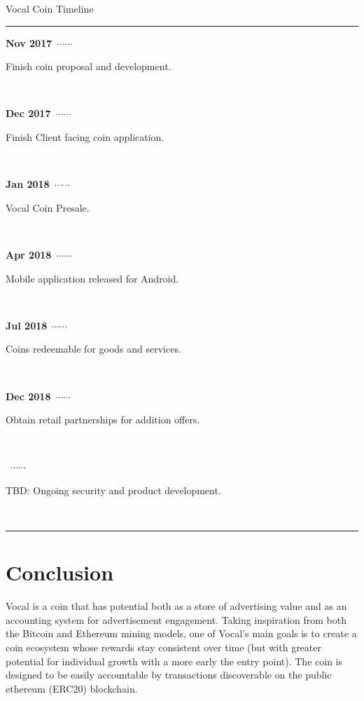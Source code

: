 \documentclass[conference]{IEEEtran}
\begin{document}
    \newcommand\ytl[2]{
    \parbox[b]{8em}{\hfill{\color{cyan}\bfseries\sffamily #1}~$\cdots\cdots$~}\makebox[0pt][c]{$\bullet$}\vrule\quad \parbox[c]{3cm}{\vspace{7pt}\color{red!40!black!80}\raggedright\sffamily #2.\\[7pt]}\\[-3pt]}
    \begin{table}
    \caption{Vocal Coin Timeline}
    \centering
    \begin{minipage}[t]{\linewidth}
    \color{gray}
    \rule{\linewidth}{1pt}
    \ytl{Nov 2017}{Finish coin proposal and development}
    \ytl{Dec 2017}{Finish Client facing coin application}
    \ytl{Jan 2018}{Vocal Coin Presale}
    \ytl{Apr 2018}{Mobile application released for Android}
    \ytl{Jul 2018}{Coins redeemable for goods and services}
    \ytl{Dec 2018}{Obtain retail partnerships for addition offers}
    \ytl{2019}{TBD: Ongoing security and product development}
    \bigskip
    \rule{\linewidth}{1pt}%
    \end{minipage}%
    \end{table}

      
      
    
    \section{Conclusion}
   Vocal is a coin that has potential both as a store of advertising value and as an accounting system for advertisement engagement. Taking inspiration from both the Bitcoin and Ethereum mining models, one of Vocal's main goals is to create a coin ecosystem whose rewards stay consistent over time (but with greater potential for individual growth with a more early the entry point). The coin is designed to be easily accountable by transactions discoverable on the public ethereum (ERC20) blockchain.
\end{document}
